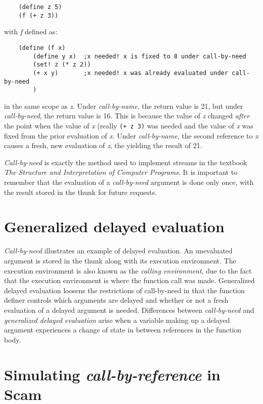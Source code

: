 \begin{verbatim}
    (define z 5)
    (f (+ z 3)) 
\end{verbatim}

with {\it f} defined as:

\begin{verbatim}
    (define (f x)
        (define y x)  ;x needed! x is fixed to 8 under call-by-need
        (set! z (* z 2))
        (+ x y)       ;x needed! x was already evaluated under call-by-need
        )
\end{verbatim}

in the same scope as {\it z}.
Under {\it call-by-name}, the return value is 21, but under
{\it call-by-need}, the return value is 16.
This is because the
value of {\it z} changed {\it after} the point when the value of {\it x}
(really \verb!(+ z 3)! was needed and the value of {\it x} was fixed from
the prior evaluation of {\it x}. Under {\it call-by-name}, the second
reference to {\it x} causes a fresh, new evaluation of {\it z},
the yielding the result of 21.

{\it Call-by-need}
is exactly the method used to implement streams in the 
textbook
{\it The Structure and Interpretation of Computer Programs}.
It is important to remember that the evaluation of a
{\it call-by-need} argument is done only once, 
with the result stored in the thunk for future requests.

\section*{Generalized delayed evaluation}

{\it Call-by-need} illustrates an example of delayed evaluation.
An unevaluated argument is stored in the thunk along with
its execution environment. The execution environment
is also known as the {\it calling environment},
due to the fact that the execution environment is where the
function call was made. Generalized delayed evaluation
loosens the restrictions of call-by-need in that the
function definer controls which arguments are delayed and
whether or not a fresh evaluation of a delayed argument
is needed.
Differences between {\it call-by-need} and
{\it generalized delayed evaluation}
arise when a variable making up a delayed argument 
experiences a change of state in between references in
the function body.

\section*{Simulating {\it call-by-reference} in Scam}

